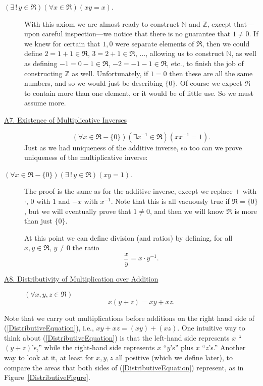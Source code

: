 \begin{theorem}$(\exists \,!\, y\in\Re)(\forall x\in\Re)(xy=x)$.
\end{theorem}
\begin{description}
\item[\hphantom{HI}]\hfill
\newline
With this axiom we are almost ready to construct
$\mathbb{N}$ and $\mathbb{Z}$, except that---upon
careful inspection---we notice that there is no
guarantee that $1\ne0$.  If we knew for certain
that $1,0$ were separate
elements of $\Re$, then we could define $2=1+1\in\Re$,
$3=2+1\in\Re$, $\dots$, allowing us to construct $\mathbb{N}$,
as well as defining $-1=0-1\in\Re$, $-2=-1-1\in\Re$,
etc., to finish the job of constructing $\mathbb{Z}$ as well.
Unfortunately, if $1=0$ then these are all the same
numbers, and so we would just be describing $\{0\}$.  Of course
we expect  $\Re$ to contain more than one element,
or it would be of little use.  So we must assume more.

\item[\ul{A7. Existence of Multiplicative Inverses}]
$$(\forall x\in\Re-\{0\})
(\exists x^{-1}\in\Re)( xx^{-1}=1).$$
Just as we had uniqueness of the additive inverse, so too 
can we prove uniqueness of the multiplicative inverse:
\end{description}
\begin{theorem}
$(\forall x\in\Re-\{0\})(\exists \,!\, y\in\Re)(xy=1)$.
\label{UniquenessOfAdditiveInverseTheorem} 
\end{theorem}
\begin{description}
\item[]\hfill\newline
The proof is the same as for the additive inverse, except
we replace $+$ with $\cdot$, $0$ with $1$ and
$-x$ with $x^{-1}$. Note that this is all vacuously true
if $\Re=\{0\}$, but we will eventually prove that
$1\ne0$, and then we will know $\Re$ is more than just
$\{0\}$.

At this point  we can define division 
(and ratios) by defining,
for all $x,y\in\Re$, $y\ne0$
the ratio 
\begin{equation}
\frac{x}y=x\cdot y^{-1}.\end{equation}

\item[\ul{A8. Distributivity of Multiplication over Addition}]
$(\forall x,y,z\in\Re)$ 
\begin{equation}x(y+z)=xy+xz.\label{DistributiveEquation}\end{equation}
\end{description}
Note that we carry out multiplications before additions on the
right hand side of (\ref{DistributiveEquation}), i.e.,
$xy+xz=(xy)+(xz)$. One intuitive way to think about 
(\ref{DistributiveEquation}) is that the left-hand side
represents $x$ ``$(y+z)$'s,'' while the right-hand side
represents $x$ ``$y$'s'' plus $x$ ``$z$'s.''  Another
way to look at it, at least for $x,y,z$ all positive (which we
define later), to compare the areas that both sides of
(\ref{DistributiveEquation}) represent, as in 
Figure~\ref{DistributiveFigure}.

